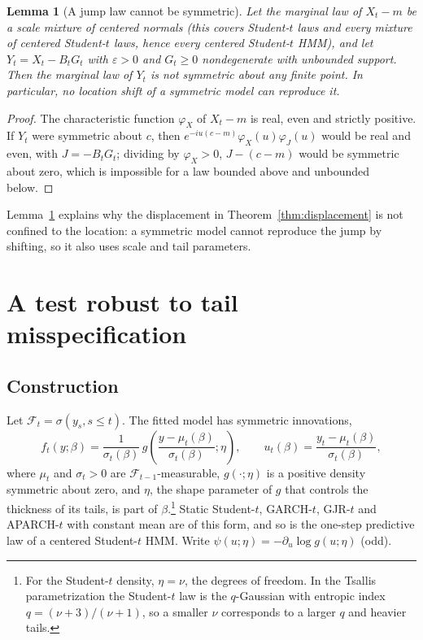 \documentclass[11pt,a4paper]{article}
\newtheorem{lemma}{Lemma}
\theoremstyle{definition}
\theoremstyle{remark}
\newcommand{\F}{\mathcal{F}}
\begin{document}
\begin{lemma}[A jump law cannot be symmetric]\label{lem:noneq}
Let the marginal law of $X_t-m$ be a scale mixture of centered normals (this covers Student-$t$ laws and every mixture of centered Student-$t$ laws, hence every centered Student-$t$ HMM), and let $Y_t=X_t-B_tG_t$ with $\varepsilon>0$ and $G_t\ge0$ nondegenerate with unbounded support. Then the marginal law of $Y_t$ is not symmetric about any finite point. In particular, no location shift of a symmetric model can reproduce it.
\end{lemma}
\begin{proof}
The characteristic function $\varphi_X$ of $X_t-m$ is real, even and strictly positive. If $Y_t$ were symmetric about $c$, then $e^{-iu(c-m)}\varphi_X(u)\varphi_J(u)$ would be real and even, with $J=-B_tG_t$; dividing by $\varphi_X>0$, $J-(c-m)$ would be symmetric about zero, which is impossible for a law bounded above and unbounded below.
\end{proof}
\noindent Lemma~\ref{lem:noneq} explains why the displacement in Theorem~\ref{thm:displacement} is not confined to the location: a symmetric model cannot reproduce the jump by shifting, so it also uses scale and tail parameters.

\section{A test robust to tail misspecification}\label{sec:test}
\subsection{Construction}
Let $\F_t=\sigma(y_s,s\le t)$. The fitted model has symmetric innovations,
\begin{equation}\label{eq:model}
f_t(y;\beta)=\frac{1}{\sigma_t(\beta)}\,g\!\left(\frac{y-\mu_t(\beta)}{\sigma_t(\beta)};\eta\right),\qquad u_t(\beta)=\frac{y_t-\mu_t(\beta)}{\sigma_t(\beta)},
\end{equation}
where $\mu_t$ and $\sigma_t>0$ are $\F_{t-1}$-measurable, $g(\cdot;\eta)$ is a positive density symmetric about zero, and $\eta$, the shape parameter of $g$ that controls the thickness of its tails, is part of $\beta$.\footnote{For the Student-$t$ density, $\eta=\nu$, the degrees of freedom. In the Tsallis parametrization the Student-$t$ law is the $q$-Gaussian with entropic index $q=(\nu+3)/(\nu+1)$, so a smaller $\nu$ corresponds to a larger $q$ and heavier tails.} Static Student-$t$, GARCH-$t$, GJR-$t$ \citep{gjr1993} and APARCH-$t$ with constant mean are of this form, and so is the one-step predictive law of a centered Student-$t$ HMM. Write $\psi(u;\eta)=-\partial_u\log g(u;\eta)$ (odd).
\end{document}
